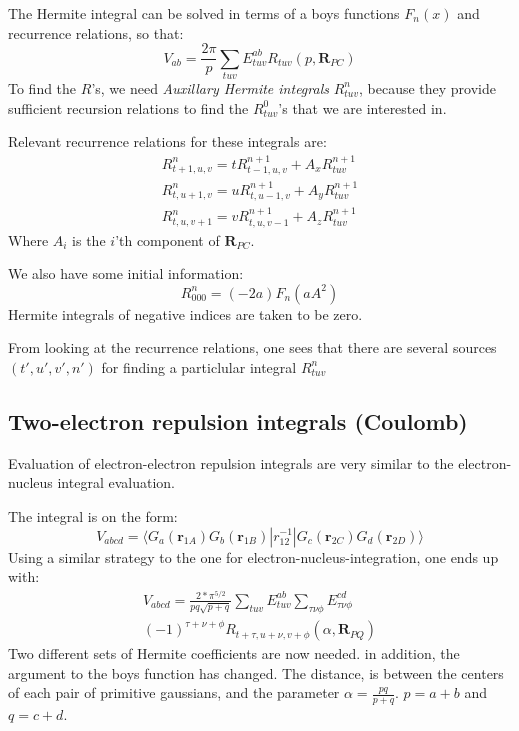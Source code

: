\documentclass[a4paper,10pt, twocolumn, pre]{revtex4}
\newcommand{\rvec}{\mathbf{r}}
\newcommand{\mb}{\mathbf}
\newcommand{\sandwich}[3]{\langle {#1}|{#2}|{#3}\rangle}
\begin{document}
The Hermite integral can be solved in terms of a boys functions $F_n(x)$ and recurrence relations, so that:
\begin{equation}
	V_{ab} = \frac{2\pi}{p}\sum_{tuv} E_{tuv}^{ab} R_{tuv}(p, \mb{R}_{PC})
\end{equation}
To find the $R$'s, we need \emph{Auxillary Hermite integrals} $R_{tuv}^n$, because they provide sufficient recursion relations to find the $R_{tuv}^0$'s that we are interested in.

Relevant recurrence relations for these integrals are:
\begin{align}
R_{t+1, u, v}^n = tR_{t-1, u, v}^{n+1} + A_xR_{tuv}^{n+1} \\
R_{t, u+1, v}^n = uR_{t, u-1, v}^{n+1} + A_yR_{tuv}^{n+1} \\
R_{t, u, v+1}^n = vR_{t, u, v-1}^{n+1} + A_zR_{tuv}^{n+1}
\end{align}
Where $A_i$ is the $i$'th component of $\mb{R}_{PC}$.

We also have some initial information:
\begin{equation}
	R_{000}^n = (-2a)F_n(aA^2)
\end{equation}
Hermite integrals of negative indices are taken to be zero.

From looking at the recurrence relations, one sees that there are several sources $(t', u', v', n')$ for finding a particlular integral $R_{tuv}^{n}$

\subsection{Two-electron repulsion integrals (Coulomb)}
Evaluation of electron-electron repulsion integrals are very similar to the electron-nucleus integral evaluation.

The integral is on the form:
\begin{equation}
	V_{abcd} = \sandwich{G_a(\rvec_{1A})G_b(\rvec_{1B})}{r_{12}^{-1}}{G_c(\rvec_{2C})G_d(\rvec_{2D})}
\end{equation}
Using a similar strategy to the one for electron-nucleus-integration, one ends up with:
\begin{align}
	V_{abcd} = \frac{2*\pi^{5/2}}{pq\sqrt{p+q}} \sum_{tuv}E_{tuv}^{ab}\sum_{\tau\nu\phi}E_{\tau\nu\phi}^{cd} \nonumber\\
	(-1)^{\tau+\nu+\phi}R_{t+\tau, u+\nu, v+\phi}(\alpha, \mb{R}_{PQ})
\end{align}
Two different sets of Hermite coefficients are now needed. in addition, the argument to the boys function has changed. The distance, is between the centers of each pair of primitive gaussians, and the parameter $\alpha = \frac{pq}{p+q}$. $p = a+b$ and $q = c+d$.
\end{document}
